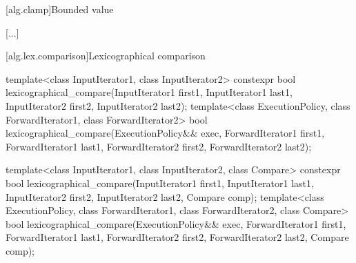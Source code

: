 [alg.clamp]{Bounded value}

[...]

[alg.lex.comparison]{Lexicographical comparison}

%
\begin{itemdecl}
template<class InputIterator1, class InputIterator2>
  constexpr bool
    lexicographical_compare(InputIterator1 first1, InputIterator1 last1,
                            InputIterator2 first2, InputIterator2 last2);
template<class ExecutionPolicy, class ForwardIterator1, class ForwardIterator2>
  bool
    lexicographical_compare(ExecutionPolicy&& exec,
                            ForwardIterator1 first1, ForwardIterator1 last1,
                            ForwardIterator2 first2, ForwardIterator2 last2);

template<class InputIterator1, class InputIterator2, class Compare>
  constexpr bool
    lexicographical_compare(InputIterator1 first1, InputIterator1 last1,
                            InputIterator2 first2, InputIterator2 last2,
                            Compare comp);
template<class ExecutionPolicy, class ForwardIterator1, class ForwardIterator2,
         class Compare>
  bool
    lexicographical_compare(ExecutionPolicy&& exec,
                            ForwardIterator1 first1, ForwardIterator1 last1,
                            ForwardIterator2 first2, ForwardIterator2 last2,
                            Compare comp);
\end{itemdecl}

